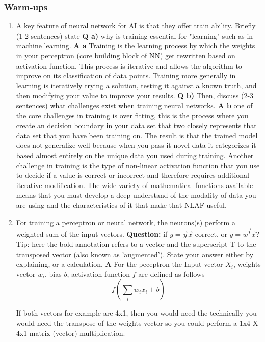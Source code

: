\documentclass[main.tex]{subfiles}
\begin{document}
\subsubsection{Warm-ups}
\begin{enumerate}

\item A key feature of neural network for AI is that they offer train ability. Briefly (1-2 sentences) state \textbf{Q a)} why is training essential for "learning" such as in machine learning. \textbf{A a} Training is the learning process by which the weights in your perceptron (core building block of NN) get rewritten based on activation function. This process is iterative and allows the algorithm to improve on its classification of data points. Training more generally in learning is iteratively trying a solution, testing it against a known truth, and then modifying your value to improve your results. \textbf{Q b)} Then, discuss (2-3 sentences) what challenges exist when training neural networks. \textbf{A b} one of the core challenges in training is over fitting, this is the process where you create an decision boundary in your data set that two closely represents that data set that you have been training on. The result is that the trained model does not generalize well because when you pass it novel data it categorizes it based almost entirely on the unique data you used during training. Another challenge in training is the type of non-linear activation function that you use to decide if a value is correct or incorrect and therefore requires additional iterative modification. The wide variety of mathematical functions available means that you must develop a deep understand of the modality of data you are using and the characteristics of it that make that NLAF useful.

\item For training a perceptron or neural network, the neurons(s) perform a weighted sum of the input vectors. \textbf{Question:} if $y = \vec{y}\vec{x}$ correct, or $y=\vec{w^T}\vec{x}$? Tip: here the bold annotation refers to a vector and the superscript T to the transposed vector (also known as 'augmented'). State your answer either by explaining, or a calculation. \textbf{A} For the peceptron the Input vector $X_i$, weights vector $w_i$, bias $b$, activation function $f$ are defined as follows
$$f\left(\sum_{i} w_{i} x_{i}+b\right)$$

If both vectors for example are 4x1, then you would need the technically you would need the transpose of the weights vector so you could perform a 1x4 X 4x1 matrix (vector) multiplication.


\end{enumerate}
\end{document}
